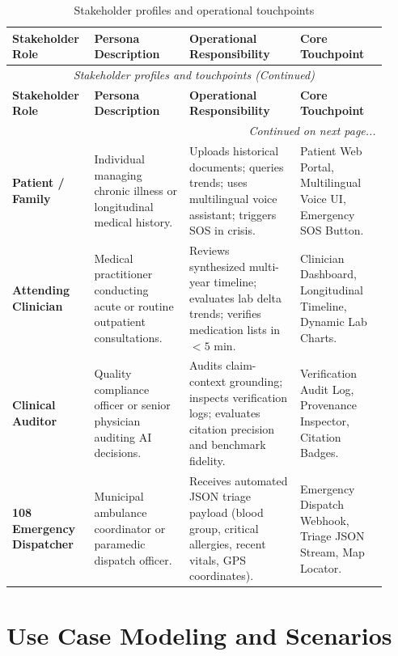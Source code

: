 \small
\begin{longtable}{@{}p{0.18\linewidth} p{0.24\linewidth} p{0.28\linewidth} p{0.22\linewidth}@{}}
\caption{Stakeholder profiles and operational touchpoints}\label{tab:3_1_stakeholders} \\
\toprule
\textbf{Stakeholder Role} & \textbf{Persona Description} & \textbf{Operational Responsibility} & \textbf{Core Touchpoint} \\
\midrule
\endfirsthead
\toprule
\multicolumn{4}{c}{\small\textit{Stakeholder profiles and touchpoints (Continued)}} \\[4pt]
\midrule
\textbf{Stakeholder Role} & \textbf{Persona Description} & \textbf{Operational Responsibility} & \textbf{Core Touchpoint} \\
\midrule
\endhead
\midrule
\multicolumn{4}{r}{\footnotesize\textit{Continued on next page...}} \\
\bottomrule
\endfoot
\bottomrule
\endlastfoot
\textbf{Patient / Family} & Individual managing chronic illness or longitudinal medical history. & Uploads historical documents; queries trends; uses multilingual voice assistant; triggers SOS in crisis. & Patient Web Portal, Multilingual Voice UI, Emergency SOS Button. \\
\midrule
\textbf{Attending Clinician} & Medical practitioner conducting acute or routine outpatient consultations. & Reviews synthesized multi-year timeline; evaluates lab delta trends; verifies medication lists in $<5\text{ min}$. & Clinician Dashboard, Longitudinal Timeline, Dynamic Lab Charts. \\
\midrule
\textbf{Clinical Auditor} & Quality compliance officer or senior physician auditing AI decisions. & Audits claim-context grounding; inspects verification logs; evaluates citation precision and benchmark fidelity. & Verification Audit Log, Provenance Inspector, Citation Badges. \\
\midrule
\textbf{108 Emergency Dispatcher} & Municipal ambulance coordinator or paramedic dispatch officer. & Receives automated JSON triage payload (blood group, critical allergies, recent vitals, GPS coordinates). & Emergency Dispatch Webhook, Triage JSON Stream, Map Locator. \\
\bottomrule
\end{longtable}
\normalsize


\section{Use Case Modeling and Scenarios}
\label{sec:sys_use_cases}

